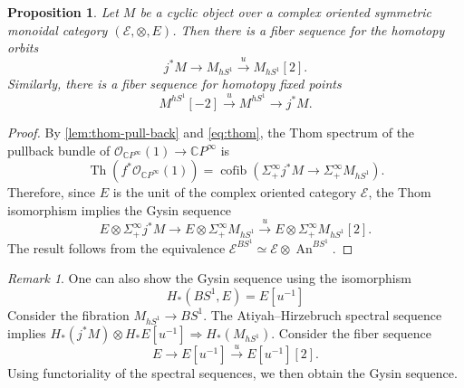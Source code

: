 \documentclass[11pt]{amsart}
\numberwithin{equation}{section}
\theoremstyle{plain}
\newtheorem{Prop}[prop]{Proposition}
\theoremstyle{definition}
\theoremstyle{remark}
\newtheorem{RMK}[rmk]{Remark}
\newcommand{\bC} { {\mathbb{C}}}
\newcommand{\cE} { {\mathcal{E}}}
\newcommand{\cO} { {\mathcal{O}}}
\newcommand{\Thom}{\operatorname{Th}}
\newcommand\An{ {\operatorname{An} } }
\begin{document}
\begin{Prop}\label{prop:Gysin}
    Let $M$ be a cyclic object over a complex oriented symmetric monoidal category $(\cE, \otimes, E)$. Then there is a fiber sequence for the homotopy orbits
    \[j^*M \to M_{hS^1} \xrightarrow{u} M_{hS^1}[2].\]
    Similarly, there is a fiber sequence for homotopy fixed points
    \[M^{hS^1}[-2] \xrightarrow{u} M^{hS^1} \to j^*M.\]
\end{Prop}
\begin{proof}
    By \autoref{lem:thom-pull-back} and \autoref{eq:thom}, the Thom spectrum of the pullback bundle of $\cO_{\bC P^\infty}(1) \to \bC P^\infty$ is
    \[\Thom(f^*\cO_{\bC P^\infty}(1)) = \operatorname{cofib}(\Sigma^\infty_+j^*M \to \Sigma^\infty_+M_{hS^1}).\]
    Therefore, since $E$ is the unit of the complex oriented category $\cE$, the Thom isomorphism implies the Gysin sequence
    \[E \otimes \Sigma^\infty_+j^*M \to E \otimes \Sigma^\infty_+M_{hS^1} \xrightarrow{u} E \otimes \Sigma^\infty_+M_{hS^1}[2].\]
    The result follows from the equivalence $\cE^{BS^1} \simeq \cE \otimes \An^{BS^1}$.
\end{proof}
    
    




\begin{RMK}    One can also show the Gysin sequence using the isomorphism 
    \[H_*(BS^1, E) = E[u^{-1}]\]
    Consider the fibration $M_{hS^1} \rightarrow BS^1$. The Atiyah–Hirzebruch spectral sequence implies $H_*(j^*M) \otimes H_*E[u^{-1}] \Rightarrow H_*(M_{hS^1})$. Consider the fiber sequence 
    \begin{equation}E \to E[u^{-1}] \xrightarrow{u} E[u^{-1}][2].\end{equation}
    Using functoriality of the spectral sequences, we then obtain the Gysin sequence.
\end{RMK}
\end{document}
